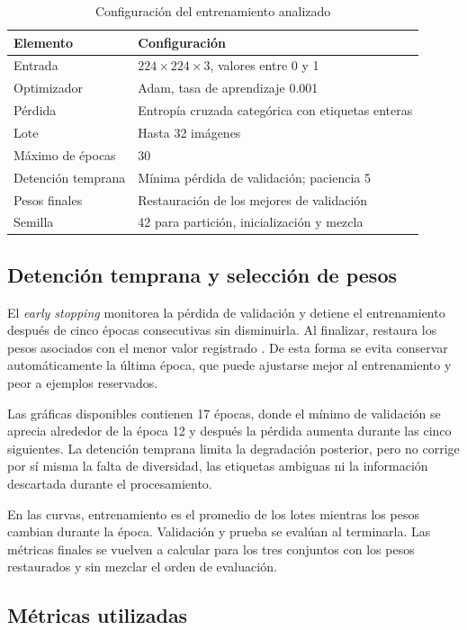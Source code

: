 \documentclass[conference]{IEEEtran}
\begin{document}
\begin{table}[!htbp]
\caption{Configuración del entrenamiento analizado}
\label{tab:entrenamiento}
\centering
\small
\begin{tabularx}{\columnwidth}{lX}
\toprule
Elemento & Configuración \\
\midrule
Entrada & $224\times224\times3$, valores entre 0 y 1 \\
Optimizador & Adam, tasa de aprendizaje 0.001 \\
Pérdida & Entropía cruzada categórica con etiquetas enteras \\
Lote & Hasta 32 imágenes \\
Máximo de épocas & 30 \\
Detención temprana & Mínima pérdida de validación; paciencia 5 \\
Pesos finales & Restauración de los mejores de validación \\
Semilla & 42 para partición, inicialización y mezcla \\
\bottomrule
\end{tabularx}
\end{table}

\subsection{Detención temprana y selección de pesos}

El \textit{early stopping} monitorea la pérdida de validación y detiene el entrenamiento después de cinco épocas consecutivas sin disminuirla. Al finalizar, restaura los pesos asociados con el menor valor registrado \citep{kerasEarly}. De esta forma se evita conservar automáticamente la última época, que puede ajustarse mejor al entrenamiento y peor a ejemplos reservados.

Las gráficas disponibles contienen 17 épocas, donde el mínimo de validación se aprecia alrededor de la época 12 y después la pérdida aumenta durante las cinco siguientes. La detención temprana limita la degradación posterior, pero no corrige por sí misma la falta de diversidad, las etiquetas ambiguas ni la información descartada durante el procesamiento.

En las curvas, entrenamiento es el promedio de los lotes mientras los pesos cambian durante la época. Validación y prueba se evalúan al terminarla. Las métricas finales se vuelven a calcular para los tres conjuntos con los pesos restaurados y sin mezclar el orden de evaluación.

\subsection{Métricas utilizadas}
\end{document}
